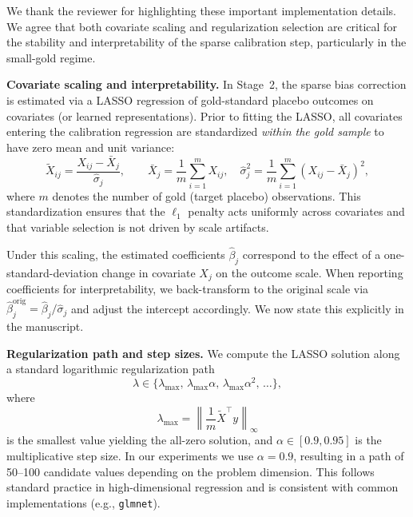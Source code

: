 {\color{blue}
We thank the reviewer for highlighting these important implementation details. We agree that both covariate scaling and regularization selection are critical for the stability and interpretability of the sparse calibration step, particularly in the small-gold regime.

\medskip
\noindent
\textbf{Covariate scaling and interpretability.}
In Stage~2, the sparse bias correction is estimated via a LASSO regression of gold-standard placebo outcomes on covariates (or learned representations). Prior to fitting the LASSO, all covariates entering the calibration regression are standardized \emph{within the gold sample} to have zero mean and unit variance:
\[
\tilde X_{ij}
=
\frac{X_{ij}-\bar X_j}{\hat\sigma_j},
\qquad
\bar X_j=\frac{1}{m}\sum_{i=1}^m X_{ij},
\quad
\hat\sigma_j^2=\frac{1}{m}\sum_{i=1}^m (X_{ij}-\bar X_j)^2,
\]
where $m$ denotes the number of gold (target placebo) observations. This standardization ensures that the $\ell_1$ penalty acts uniformly across covariates and that variable selection is not driven by scale artifacts.

Under this scaling, the estimated coefficients $\hat\beta_j$ correspond to the effect of a one-standard-deviation change in covariate $X_j$ on the outcome scale. When reporting coefficients for interpretability, we back-transform to the original scale via $\hat\beta_j^{\mathrm{orig}}=\hat\beta_j/\hat\sigma_j$ and adjust the intercept accordingly. We now state this explicitly in the manuscript.

\medskip
\noindent
\textbf{Regularization path and step sizes.}
We compute the LASSO solution along a standard logarithmic regularization path
\[
\lambda \in \{\lambda_{\max},\, \lambda_{\max}\alpha,\, \lambda_{\max}\alpha^2,\,\ldots\},
\]
where
\[
\lambda_{\max}
=
\left\|\frac{1}{m} \tilde X^\top y\right\|_\infty
\]
is the smallest value yielding the all-zero solution, and $\alpha\in[0.9,0.95]$ is the multiplicative step size. In our experiments we use \(\alpha=0.9\), resulting in a path of 50--100 candidate values depending on the problem dimension. This follows standard practice in high-dimensional regression and is consistent with common implementations (e.g., \texttt{glmnet}).

}

